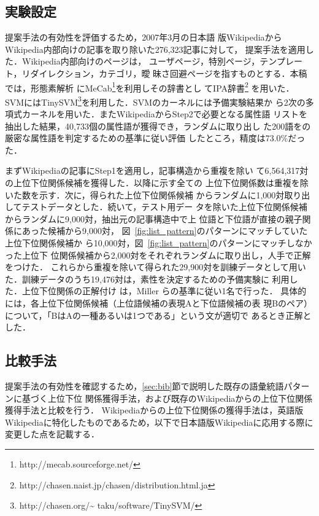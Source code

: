 \documentclass[japanese]{jnlp_1.4}
\begin{document}
\subsection{実験設定}

提案手法の有効性を評価するため，2007年3月の日本語
版WikipediaからWikipedia内部向けの記事を取り除いた276,323記事に対して，
提案手法を適用した．{Wikipedia内部向けのページは，
  ユーザページ，特別ページ，テンプレート，リダイレクション，カテゴリ，曖
  昧さ回避ページを指すものとする．}本稿では，形態素解析
にMeCab\footnote{http://mecab.sourceforge.net/}を利用しその辞書とし
てIPA辞書\footnote{http://chasen.naist.jp/chasen/distribution.html.ja}
を用いた．
SVMにはTinySVM\footnote{http://chasen.org/\~{}
  taku/software/TinySVM/}を利用した．SVMのカーネルには予備実験結果か
ら2次の多項式カーネルを用いた．またWikipediaからStep2で必要となる属性語
リストを抽出した結果，40,733個の属性語が獲得でき，ランダムに取り出し
た200語を\cite{JTokunaga_2006}の厳密な属性語を判定するための基準に従い評価
したところ，精度は73.0\%だった．

まずWikipediaの記事にStep1を適用し，記事構造から{重複を除い
  て}6,564,317対の上位下位関係候補を獲得した．{以降に示す全ての
  上位下位関係数は重複を除いた数を示す．}次に，得られた上位下位関係候補
からランダムに1,000対取り出してテストデータとした．続いて，テスト用デー
タを除いた上位下位関係候補からランダムに9,000対，抽出元の記事構造中で上
位語と下位語が直接の親子関係にあった候補から9,000対，
図~\ref{fig:list_pattern}のパターンにマッチしていた上位下位関係候補か
ら10,000対，図~\ref{fig:list_pattern}のパターンにマッチしなかった上位下
位関係候補から2,000対をそれぞれランダムに取り出し，人手で正解をつけた．
これらから重複を除いて得られた29,900対を訓練データとして用い
た．{訓練データのうち19,476対は，素性を決定するための予備実験に
  利用した．上位下位関係の正解付け
  は，Miller ら}\cite{wordnet-book_1998}{の基準に従い1名で行っ{た\nobreak．}
  具体的には，各上位下位関係候補（上位語候補の表現Aと下位語候補の表
  現Bのペア）につい{て\nobreak，}「BはAの一種あるいは1つである」という文が適切で
  あるとき正解とした．}







\subsection{比較手法}\label{sec:altermethod}

提案手法の有効性を確認するため，\ref{sec:bib}節で説明した既存の語彙統語パターンに基づく上位下位
関係獲得手法\cite{Sumida_2006}，および既存のWikipediaからの上位下位関係
獲得手法\cite{Kazama_2007,Suchanek_2007}と比較を行う．
Wikipediaからの上位下位関係の獲得手法は，英語版Wikipediaに特化したものであるため，以下で日本語版Wikipediaに応用する際に変更した点を記載する．
\end{document}
